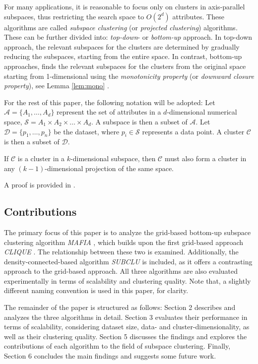For many applications, it is reasonable to focus only on clusters in axis-parallel subspaces, thus restricting the search space to $O(2^d)$ attributes. These algorithms are called \textit{subspace clustering} (or \textit{projected clustering}) algorithms. These can be further divided into: \textit{top-down}- or \textit{bottom-up} approach. In top-down approach, the relevant subspaces for the clusters are determined by gradually reducing the subspaces, starting from the entire space. In contrast, bottom-up approaches, finds the relevant subspaces for the clusters from the original space starting from 1-dimensional using the \textit{monotonicity property} (or \textit{downward closure property}), see Lemma \ref{lem:mono} \cite{clique}. \cite[p.~8,~11]{kriegel-2009}

For the rest of this paper, the following notation will be adopted: Let $\mathcal{A} = \{A_1, \dots, A_d\}$ represent the set of attributes in a $d$-dimensional numerical space, $\mathcal{S} = A_1 \times A_2 \times \dots \times A_d$. A subspace is then a subset of $\mathcal{A}$. Let $\mathcal{D} = \{p_1, \dots, p_n\}$ be the dataset, where $p_i \in \mathcal{S}$ represents a data point. A cluster $\mathcal{C}$ is then a subset of $\mathcal{D}$.

\begin{lemma}\label{lem:mono}
    If $\mathcal{C}$ is a cluster in a $k$-dimensional subspace, then $\mathcal{C}$ must also form a cluster in any $(k-1)$-dimensional projection of the same space.
\end{lemma}
A proof is provided in \cite{clique}.

\subsection{Contributions}
The primary focus of this paper is to analyze the grid-based bottom-up subspace clustering algorithm \textit{MAFIA} \cite{mafia}, which builds upon the first grid-based approach \textit{CLIQUE} \cite{clique}. The relationship between these two is examined. Additionally, the density-connected-based algorithm \textit{SUBCLU} \cite{subclu} is included, as it offers a contrasting approach to the grid-based approach. All three algorithms are also evaluated experimentally in terms of scalability and clustering quality. Note that, a slightly different naming convention is used in this paper, for clarity.

The remainder of the paper is structured as follows: Section 2 describes and analyzes the three algorithms in detail. Section 3 evaluates their performance in terms of scalability, considering dataset size, data- and cluster-dimensionality, as well as their clustering quality. Section 5 discusses the findings and explores the contributions of each algorithm to the field of subspace clustering. Finally, Section 6 concludes the main findings and suggests some future work.